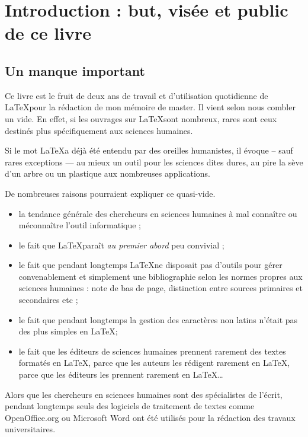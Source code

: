 \chapter{Introduction : but, visée et public de ce livre}
\section{Un manque important}

Ce livre est le fruit de deux ans de travail et d'utilisation quotidienne de \LaTeX pour la rédaction de mon mémoire de master. Il vient selon nous combler un vide. En effet, si les ouvrages sur \LaTeX sont nombreux, rares sont ceux destinés plus spécifiquement aux sciences humaines. 

Si le mot \LaTeX a déjà été entendu par des oreilles humanistes, il évoque -- sauf rares exceptions --- au mieux un outil pour les sciences dites dures, au pire la sève d'un arbre ou un plastique aux nombreuses applications. 

De nombreuses raisons pourraient expliquer ce quasi-vide.
\begin{itemize}
\item la tendance générale des chercheurs en sciences humaines à mal connaître ou méconnaître l'outil informatique ;
\item le fait que \LaTeX paraît \emph{au premier abord} peu convivial ;
\item le fait que pendant longtemps \LaTeX ne disposait pas d'outils pour gérer convenablement et simplement une bibliographie selon les normes propres aux sciences humaines : note de bas de page, distinction entre sources primaires et secondaires etc ;
\item le fait que pendant longtemps la gestion des caractères non latins n'était pas des plus simples en \LaTeX ;
\item le fait que les éditeurs de sciences humaines prennent rarement des textes formatés en \LaTeX, parce que les auteurs les rédigent rarement en \LaTeX, parce que les éditeurs les prennent rarement en \LaTeX \ldots
\end{itemize}

Alors que les chercheurs en sciences humaines sont des spécialistes de l'écrit, pendant longtemps seuls des logiciels de traitement de textes comme OpenOffice.org ou Microsoft Word ont été utilisés pour la rédaction des travaux universitaires.

